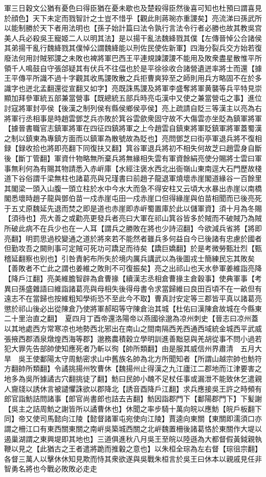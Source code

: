 軍三日穀文公猶有憂色曰得臣猶在憂未歇也及楚殺得臣然後喜可知也杜預曰謂喜見於顔色】天下未定而戮智計之士豈不惜乎【觀此則蔣琬亦重謖矣】亮流涕曰孫武所以能制勝於天下者用法明也【孫子始計篇曰法令孰行言法令行者必勝也故其教吳宫美人兵必殺吳王寵姬二人以明其法】是以揚干亂法魏絳戮其僕【左傳晉悼公合諸侯其弟揚干亂行魏絳戮其僕悼公謂魏絳能以刑佐民使佐新軍】四海分裂兵交方始若復廢法何用討賊邪謖之未敗也裨將軍巴西王平連規諫謖謖不能用及敗衆盡星散惟平所領千人鳴鼓自守張郃疑其有伏兵不往偪也於是平徐徐收合諸營遺迸率將士而還【據王平傳平所識不過十字觀其收馬謖敗散之兵拒曹爽猝至之師則用兵方略固不在於多識字也迸北孟翻還從宣翻又如字】亮既誅馬謖及將軍李盛奪將軍黄襲等兵平特見崇顯加拜參軍統五部兼當營事【既總統五部兵時亮屯漢中又使之兼當營屯之事】進位討寇將軍封亭侯【後漢之制列侯有縣侯鄉侯亭侯】亮上疏請自貶三等漢主以亮為右將軍行丞相事是時趙雲鄧芝兵亦敗於箕谷雲歛衆固守故不大傷雲亦坐貶為鎮軍將軍【據晉書職官志鎮軍將軍在四征四鎮將軍之上今趙雲自鎮東將軍貶鎮軍將軍蓋蜀漢之制以鎮東為專鎮方面而以鎮軍為散號故為貶也】亮問鄧芝曰街亭軍退兵將不復相録【録收拾也將即亮翻下同復扶又翻】箕谷軍退兵將初不相失何故芝曰趙雲身自斷後【斷丁管翻】軍資什物略無所棄兵將無緣相失雲有軍資餘絹亮使分賜將士雲曰軍事無利何為有賜其物請悉入赤㟁庫【水經注褒水西北出衙嶺山東南逕大石門歷故棧道下谷俗謂千梁無柱也諸葛亮與兄瑾書曰前趙子龍退軍燒壞赤崖閣道緣谷一百餘里其閣梁一頭入山腹一頭立柱於水中今水大而急不得安柱又云頃大水暴出赤崖以南橋閣悉壞時趙子龍與鄧伯苗一戍赤崖屯田一戍赤崖口但得緣崖與伯苗相聞而已後亮死于五丈原魏延先退而焚之即是道也赤崖即赤㟁蜀置庫於此以儲軍資】須十月為冬賜【須待也】亮大善之或勸亮更發兵者亮曰大軍在祁山箕谷皆多於賊而不破賊乃為賊所破此病不在兵少也在一人耳【謂兵之勝敗在將也少詩沼翻】今欲減兵省將【將即亮翻】明罰思過校變通之道於將來若不能然者雖兵多何益自今已後諸有忠慮於國者但勤攻吾之闕則事可定賊可死功可蹻足而待矣【蹻巨嬌翻】於是考微勞甄壯烈【甄稽延翻察也别也】引咎責躬布所失於境内厲兵講武以為後圖戎士簡練民忘其敗矣【善敗者不亡此之謂也姜維之敗則不可復振矣】亮之出祁山也天水參軍姜維詣亮降【降戶江翻】亮美維膽智辟為倉曹掾【續漢志丞相倉曹掾主倉穀事】使典軍事【考異曰孫盛雜語曰維詣諸葛亮與母相失後得母書令求當歸維曰良田百頃不在一畝但有遠志不在當歸也按維粗知學術恐不至此今不取】曹真討安定等三郡皆平真以諸葛亮懲於祁山後必出從陳倉乃使將軍郝昭等守陳倉治其城【杜佑曰漢陳倉故城在今縣東二十里治直之翻】　夏四月丁酉帝還洛陽帝以燕國徐邈為凉州刺史【晉志曰凉州蓋以其地處西方常寒凉也地勢西北邪出在南山之間南隔西羌西通西域統金城西平武威張掖西郡酒泉燉煌西海等郡】邈務農積穀立學明訓進善黜惡與羌胡從事不問小過若犯大罪先告部帥使知應死者乃斬以徇【帥所類翻】由是服其威信州界肅清　五月大旱　吳王使鄱陽太守周魴密求山中舊族名帥為北方所聞知者【所謂山越宗帥也魴符方翻帥所類翻】令譎挑揚州牧曹休【魏揚州止得漢之九江廬江二郡地而江津要害之地多為吳所據譎古穴翻挑徒了翻】魴曰民帥小醜不足杖任事或漏泄不能致休乞遣親人齎牋以誘休言被譴懼誅欲以郡降北【誘音酉降戶江翻】求兵應接吳王許之時頻有郎官詣魴詰問諸事【郎官尚書郎也詰去吉翻】魴因詣郡門下【鄱陽郡門下】下髪謝【吳主之詰周魴之謝皆所以譎曹休也】休聞之率步騎十萬向皖以應魴【皖戶板翻下同】帝又使司馬懿向江陵【懿督諸軍屯宛使向江陵】賈逵向東關【東關即濡須口亦謂之柵江口有東西關東關之南㟁吳築城西關之北㟁魏置柵後諸葛恪於東關作大堤以遏巢湖謂之東興堤即其地也】三道俱進秋八月吳王至皖以陸遜為大都督假黃鉞親執鞭以見之【此猶古之王者遣將跪而推轂之意也】以朱桓全琮為左右督【琮徂宗翻】各督三萬人以擊休休知見欺而恃其衆欲遂與吳戰朱桓言於吳王曰休本以親戚見任非智勇名將也今戰必敗敗必走走